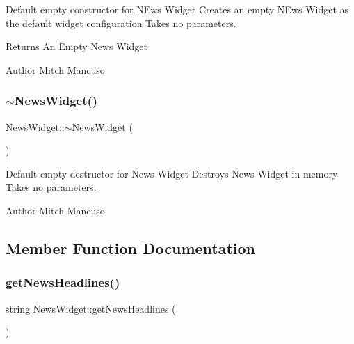 Default empty constructor for N\+Ews Widget  Creates an empty N\+Ews Widget as the default widget configuration  Takes no parameters. 

\begin{DoxyReturn}{Returns}
An Empty News Widget 
\end{DoxyReturn}
\begin{DoxyAuthor}{Author}
Mitch Mancuso 
\end{DoxyAuthor}
\mbox{\label{class_news_widget_a24c2680f9e53728e3e0674952e8a21bc}} 
\subsubsection{\texorpdfstring{$\sim$\+News\+Widget()}{~NewsWidget()}}
{\footnotesize\ttfamily News\+Widget\+::$\sim$\+News\+Widget (\begin{DoxyParamCaption}{ }\end{DoxyParamCaption})}



Default empty destructor for News Widget  Destroys News Widget in memory  Takes no parameters. 

\begin{DoxyAuthor}{Author}
Mitch Mancuso 
\end{DoxyAuthor}


\subsection{Member Function Documentation}
\mbox{\label{class_news_widget_a89b254028a1832afa896827e0e0cedf3}} 
\subsubsection{\texorpdfstring{get\+News\+Headlines()}{getNewsHeadlines()}\hspace{0.1cm}{\footnotesize\ttfamily [1/2]}}
{\footnotesize\ttfamily string News\+Widget\+::get\+News\+Headlines (\begin{DoxyParamCaption}{ }\end{DoxyParamCaption})}



